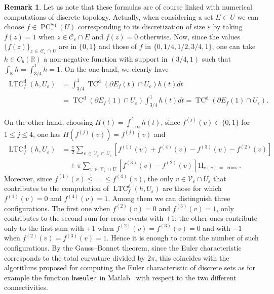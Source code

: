 \documentclass[10pt]{amsart}
\theoremstyle{definition}\newtheorem{defi}[theo]{Definition}\newtheorem{rema}[theo]{Remark}\newtheorem{exam}[theo]{Example}\newtheorem{exem}[theo]{Example}\newtheorem{nota}[theo]{Notation}
\newcommand{\R}{\mathbb{R}}
\newcommand{\ind}{{1\!\!\mathrm{I}}}
\newcommand{\eps}{\varepsilon}
\DeclareMathOperator{\TC}{TC}
\DeclareMathOperator{\LTC}{LTC}
\DeclareMathOperator{\PC}{PC}
\newcommand{\dd}{\mathrm{d}}
\DeclareMathOperator{\Sq}{Sq}
\DeclareMathOperator{\cross}{cross}
\newcommand{\calC}{\mathcal{C}}
\newcommand{\calV}{\mathcal{V}}
\begin{document}
\begin{rema}
Let us note that these formulas are of course linked with numerical computations of discrete topology. Actually, when considering a set $E\subset U$ we can choose $f\in \PC^{\Sq}_\eps(U)$ corresponding to its discretization of size $\eps$ by taking $f(z)=1$ when $z \in \calC_\eps\cap E$ and $f(z)=0$ otherwise. Now, since the values $\{f(z) \}_{z\,\in\,\calC_\eps\,\cap\,U}$ are in $\{0,1\}$ and those of $f$ in $\{0,1/4,1/2,3/4,1\}$, one can take $h\in C_b(\R)$ a non-negative function with support in $(3/4,1)$ such that $\int_{\R}h=\int_{3/4}^1h=1$. On the one hand, we clearly have
\begin{align*}
\LTC^{\dd}_f(h,U_\eps)&=\int_{3/4}^1\TC^{\dd}\left(\partial E_{f}(t)\cap U_\eps\right)h(t)dt\\
&=\TC^{\dd}\left(\partial E_{f}(1)\cap U_\eps\right)\int_{3/4}^1h(t)dt=\TC^{\dd}\left(\partial E_{f}(1) \cap U_\eps\right).
\end{align*}
\end{rema}
On the other hand, choosing $H(t)=\int_{-\infty}^th(t)$, since $f^{(j)}(v) \in \{0,1\}$ for $1\le j\le 4$, one has $H(f^{(j)}(v))=f^{(j)}(v)$ and
\begin{align*}
\LTC^{\dd}_f(h,U_\eps)&=
\frac{\pi}{2} \sum_{v\,\in\,\calV_\varepsilon\,\cap\,U_\eps} \left[f^{(1)}(v) + f^{(4)}(v)- f^{(3)}(v) - f^{(2)}(v)\right]\\
&\quad\pm \pi
\sum_{v\,\in\,\calV_\eps\,\cap\,U} \left[f^{(3)}(v) - f^{(2)}(v)\right]
\ind_{c(v)\,=\,\cross}.
\end{align*}
Moreover, since $f^{(1)}(v)\le\,\ldots\,\le f^{(4)}(v)$, the only $v\in\calV_\eps\cap U_\eps$ that contributes to the computation of $\LTC^\dd_f(h,U_\eps)$ are those for which $f^{(1)}(v)=0$ and $f^{(4)}(v)=1$. Among them we can distinguish three configurations. The first one when $f^{(2)}(v)=0$ and $f^{(3)}(v)=1$, only contributes to the second sum for cross events with $+1$; the other ones contribute only to the first sum with $+1$ when $f^{(2)}(v)=f^{(3)}(v)=0$ and with $-1$ when $f^{(2)}(v)=f^{(3)}(v)=1$. Hence it is enough to count the number of such configurations. By the Gauss--Bonnet theorem, since the Euler characteristic corresponds to the total curvature divided by $2\pi$, this coincides with the algorithms proposed for computing the Euler characteristic of discrete sets as for example the function \texttt{bweuler} in Matlab~\cite{Gray71,Pratt07} with respect to the two different connectivities.
\end{document}
